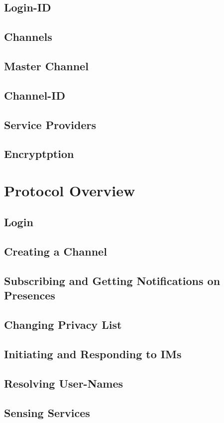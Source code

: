 \documentclass[titlepage,oneside]{book}
\begin{document}
\section{Login-ID}
\section{Channels}
\section{Master Channel}
\section{Channel-ID}
\section{Service Providers}
\section{Encryptption}

\chapter{Protocol Overview}
\section{Login}
\section{Creating a Channel}
\section{Subscribing and Getting Notifications on Presences}
\section{Changing Privacy List}
\section{Initiating and Responding to IMs}
\section{Resolving User-Names}
\section{Sensing Services}
\end{document}

